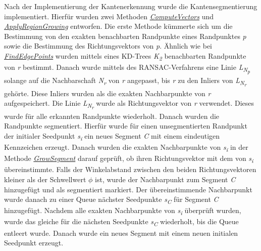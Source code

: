 Nach der Implementierung der Kantenerkennung wurde die Kantensegmentierung implementiert. Hierfür wurden zwei Methoden \textit{\hyperref[alg:compute_vectors]{ComputeVectors}} und \textit{\hyperref[alg:apply_region_growing]{ApplyRegionGrowing}} entworfen. Die erste Methode kümmerte sich um die Bestimmung von den exakten benachbarten Randpunkte eines Randpunktes \textit{p} sowie die Bestimmung des Richtungsvektors von \textit{p}. Ähnlich wie bei \textit{\hyperref[alg:find_edge_points]{FindEdgePoints}} wurden mittels eines KD-Trees \textit{K\textsubscript{2}} benachbarten Randpunkte von \textit{r} bestimmt. Danach wurde mittels des RANSAC-Verfahrens eine Linie \textit{L\textsubscript{N\textsubscript{p}}} solange auf die Nachbarschaft \textit{N\textsubscript{r}} von \textit{r} angepasst, bis \textit{r} zu den Inliers von \textit{L\textsubscript{N\textsubscript{r}}} gehörte. Diese Inliers wurden als die exakten Nachbarpunkte von \textit{r} aufgespeichert. Die Linie \textit{L\textsubscript{N\textsubscript{r}}} wurde als Richtungsvektor von \textit{r} verwendet. Dieses wurde für alle erkannten Randpunkte wiederholt. Danach wurden die Randpunkte segmentiert. Hierfür wurde für einen unsegmentierten Randpunkt \textendash{} der initialer Seedpunkt \textit{s\textsubscript{i}} \textendash{} ein neues Segment \textit{C} mit einem eindeutigen Kennzeichen erzeugt. Danach wurden die exakten Nachbarpunkte von \textit{s\textsubscript{i}} in der Methode \textit{\hyperref[alg:grow_segment]{GrowSegment}} darauf geprüft, ob ihren Richtungsvektor mit dem von \textit{s\textsubscript{i}} übereinstimmte. Falls der Winkelabstand zwischen den beiden Richtungsvektoren kleiner als der Schwellwert \textit{$\phi$} ist, wurde der Nachbarpunkt zum Segment \textit{C} hinzugefügt und als segmentiert markiert. Der übereinstimmende Nachbarpunkt wurde danach zu einer Queue nächster Seedpunkte \textit{s\textsubscript{C}} für Segment \textit{C} hinzugefügt. Nachdem alle exakten Nachbarpunkte von \textit{s\textsubscript{i}} überprüft wurden, wurde das gleiche für die nächsten Seedpunkte \textit{s\textsubscript{C}} wiederholt, bis die Queue entleert wurde. Danach wurde ein neues Segment mit einem neuen initialen Seedpunkt erzeugt.

